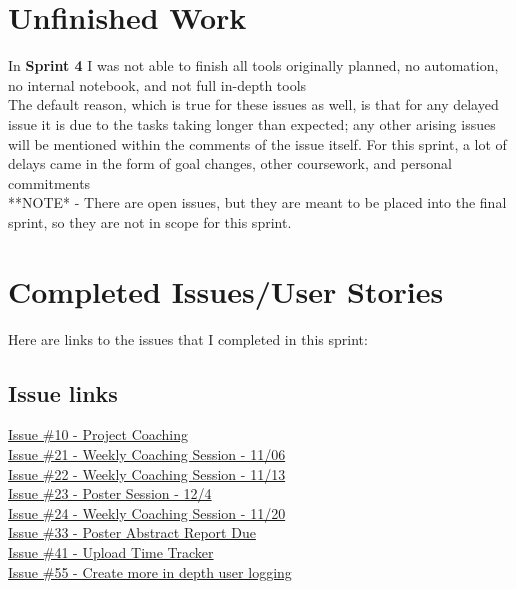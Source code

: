 \documentclass{article}
\begin{document}
\section{Unfinished Work}
\large{
In \textbf{Sprint 4} I was not able to finish all tools originally planned, no automation, no internal notebook, and not full in-depth tools\\
The default reason, which is true for these issues as well, is that for any delayed issue it is due to the tasks taking longer than expected; any other arising issues will be mentioned within the comments of the issue itself. For this sprint, a lot of delays came in the form of goal changes, other coursework, and personal commitments \\
**NOTE* - There are open issues, but they are meant to be placed into the final sprint, so they are not in scope for this sprint. \\
}
\newpage
\section{Completed Issues/User Stories}
Here are links to the issues that I completed in this sprint:
\subsection{Issue links}

\href{https://github.com/zachA214/Adelson_Senior_Capstone/issues/10}{Issue \#10 - Project Coaching} \\
\href{https://github.com/zachA214/Adelson_Senior_Capstone/issues/21}{Issue \#21 - Weekly Coaching Session - 11/06} \\
\href{https://github.com/zachA214/Adelson_Senior_Capstone/issues/22}{Issue \#22 - Weekly Coaching Session - 11/13} \\
\href{https://github.com/zachA214/Adelson_Senior_Capstone/issues/23}{Issue \#23 - Poster Session - 12/4} \\
\href{https://github.com/zachA214/Adelson_Senior_Capstone/issues/24}{Issue \#24 - Weekly Coaching Session - 11/20} \\
\href{https://github.com/zachA214/Adelson_Senior_Capstone/issues/33}{Issue \#33 - Poster Abstract Report Due} \\
\href{https://github.com/zachA214/Adelson_Senior_Capstone/issues/41}{Issue \#41 - Upload Time Tracker} \\
\href{https://github.com/zachA214/Adelson_Senior_Capstone/issues/55}{Issue \#55 - Create more in depth user logging} \\
\end{document}

